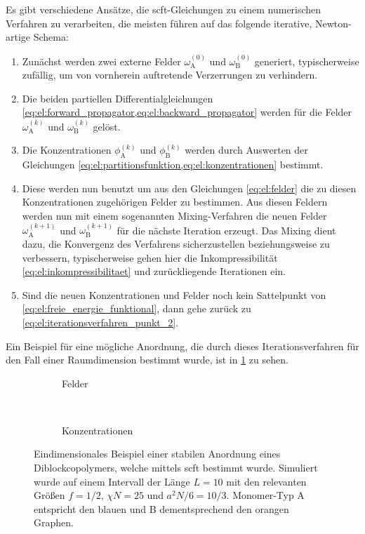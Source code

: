 Es gibt verschiedene Ansätze, die \ac{scft}-Gleichungen zu einem numerischen Verfahren zu verarbeiten, die meisten führen auf das folgende iterative, Newton-artige Schema:
\begin{enumerate}[label={\itshape\roman*.},ref={\itshape\roman*}]
    \item Zunächst werden zwei externe Felder $\omega^{(0)}_{\mathrm{A}}$ und $\omega^{(0)}_{\mathrm{B}}$ generiert, typischerweise zufällig, um von vornherein auftretende Verzerrungen zu verhindern.
    \item\label{eq:el:iterationsverfahren_punkt_2} Die beiden partiellen Differentialgleichungen \cref{eq:el:forward_propagator,eq:el:backward_propagator} werden für die Felder $\omega^{(k)}_{\mathrm{A}}$ und $\omega^{(k)}_{\mathrm{B}}$ gelöst.
    \item Die Konzentrationen $\phi^{(k)}_{\mathrm{A}}$ und $\phi^{(k)}_{\mathrm{B}}$ werden durch Auswerten der Gleichungen \cref{eq:el:partitionsfunktion,eq:el:konzentrationen} bestimmt.
    \item Diese werden nun benutzt um aus den Gleichungen \cref{eq:el:felder} die zu diesen Konzentrationen zugehörigen Felder zu bestimmen.
    Aus diesen Feldern werden nun mit einem sogenannten Mixing-Verfahren die neuen Felder $\omega^{(k+1)}_{\mathrm{A}}$ und $\omega^{(k+1)}_{\mathrm{B}}$ für die nächste Iteration erzeugt.
    Das Mixing dient dazu, die Konvergenz des Verfahrens sicherzustellen beziehungsweise zu verbessern, typischerweise gehen hier die Inkompressibilität \cref{eq:el:inkompressibilitaet} und zurückliegende Iterationen ein.
    \item Sind die neuen Konzentrationen und Felder noch kein Sattelpunkt von \cref{eq:el:freie_energie_funktional}, dann gehe zurück zu \cref{eq:el:iterationsverfahren_punkt_2}.
\end{enumerate}

Ein Beispiel für eine mögliche Anordnung, die durch dieses Iterationsverfahren für den Fall einer Raumdimension bestimmt wurde, ist in \cref{fig:el:felder_nach_iterationsverfahren} zu sehen.

\begin{figure}[tb]
    \centering
    \begin{subfigure}[b]{0.45\textwidth}
        \centering
        
        \caption{Felder}
    \end{subfigure}
    ~
    \begin{subfigure}[b]{0.45\textwidth}
        \centering
        
        \caption{Konzentrationen}
    \end{subfigure}
    \caption[%
    Eindimensionales Beispiel einer stabilen Anordnung eines Diblockcopolymers
    ]{%
        Eindimensionales Beispiel einer stabilen Anordnung eines Diblockcopolymers, welche mittels \ac{scft} bestimmt wurde.
        Simuliert wurde auf einem Intervall der Länge $L = 10$ mit den relevanten Größen $f = 1/2$, $\chi N = 25$ und $a^{2} N / 6 = 10 / 3$.
        Monomer-Typ A entspricht den blauen und B dementsprechend den orangen Graphen.
    }
    \label{fig:el:felder_nach_iterationsverfahren}
\end{figure}

